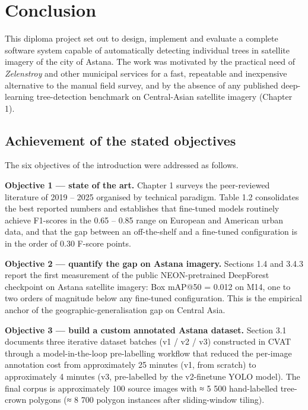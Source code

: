 \chapter*{Conclusion}

This diploma project set out to design, implement and evaluate a complete software system capable of automatically detecting individual trees in satellite imagery of the city of Astana. The work was motivated by the practical need of \emph{Zelenstroy} and other municipal services for a fast, repeatable and inexpensive alternative to the manual field survey, and by the absence of any published deep-learning tree-detection benchmark on Central-Asian satellite imagery (Chapter 1).

\section{Achievement of the stated objectives}\label{achievement-of-the-stated-objectives}

The six objectives of the introduction were addressed as follows.

\textbf{Objective 1 --- state of the art.} Chapter 1 surveys the peer-reviewed literature of 2019 -- 2025 organised by technical paradigm. Table 1.2 consolidates the best reported numbers and establishes that fine-tuned models routinely achieve F1-scores in the 0.65 -- 0.85 range on European and American urban data, and that the gap between an off-the-shelf and a fine-tuned configuration is in the order of 0.30 F-score points.

\textbf{Objective 2 --- quantify the gap on Astana imagery.} Sections 1.4 and 3.4.3 report the first measurement of the public NEON-pretrained DeepForest checkpoint on Astana satellite imagery: Box mAP@50 = 0.012 on M14, one to two orders of magnitude below any fine-tuned configuration. This is the empirical anchor of the geographic-generalisation gap on Central Asia.

\textbf{Objective 3 --- build a custom annotated Astana dataset.} Section 3.1 documents three iterative dataset batches (v1 / v2 / v3) constructed in CVAT through a model-in-the-loop pre-labelling workflow that reduced the per-image annotation cost from approximately 25 minutes (v1, from scratch) to approximately 4 minutes (v3, pre-labelled by the v2-finetune YOLO model). The final corpus is approximately 100 source images with ≈ 5 500 hand-labelled tree-crown polygons (≈ 8 700 polygon instances after sliding-window tiling).

